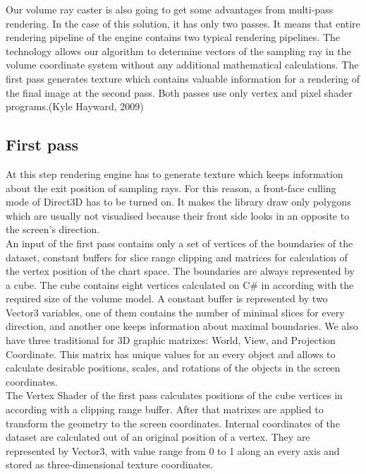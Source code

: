 \documentclass[twoside, english, 11pt]{report}
\begin{document}
Our volume ray caster is also going to get some advantages from multi-pass rendering. In the case of this solution, it has only two passes. It means that entire rendering pipeline of the engine contains two typical rendering pipelines. The technology allows our algorithm to determine vectors of the sampling ray in the volume coordinate system without any additional mathematical calculations. The first pass generates texture which contains valuable information for a rendering of the final image at the second pass. Both passes use only vertex and pixel shader programs.(Kyle Hayward, 2009)

\subsection{First pass}

At this step rendering engine has to generate texture which keeps information about the exit position of sampling rays. For this reason, a front-face culling mode of Direct3D has to be turned on. It makes the library draw only polygons which are usually not visualised because their front side looks in an opposite to the screen's direction.\\

An input of the first pass contains only a set of vertices of the boundaries of the dataset, constant buffers for slice range clipping and matrices for calculation of the vertex position of the chart space. The boundaries are always represented by a cube. The cube contains eight vertices calculated on C\# in according with the required size of the volume model. A constant buffer is represented by two Vector3 variables, one of them contains the number of minimal slices for every direction, and another one keeps information about maximal boundaries. We also have three traditional for 3D graphic matrixes: World, View, and Projection Coordinate. This matrix has unique values for an every object and allows to calculate desirable positions, scales, and rotations of the objects in the screen coordinates.\\

The Vertex Shader of the first pass calculates positions of the cube vertices in according with a clipping range buffer. After that matrixes are applied to transform the geometry to the screen coordinates. Internal coordinates of the dataset are calculated out of an original position of a vertex. They are represented by Vector3, with value range from 0 to 1 along an every axis and stored as three-dimensional texture coordinates.\\
\end{document}
